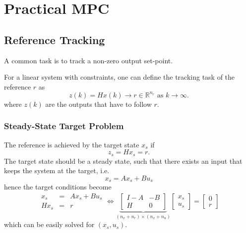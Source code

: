 \section{Practical MPC}

\subsection{Reference Tracking}

A common task is to track a non-zero output set-point.

For a linear system with constraints, one can define the tracking task of the reference $r$ as
\begin{equation*}
    z(k) = Hx(k) \to r\in \mathbb{R}^{n_r} \text{ as } k \to \infty.
\end{equation*}
where $z(k)$ are the outputs that have to follow $r$.

\subsubsection{Steady-State Target Problem}

The reference is achieved by the target state $x_s$ if
\begin{equation*}
    z_s = Hx_s = r.
\end{equation*}
The target state should be a steady state, such that there exists an input that keeps the system at the target, i.e.
\begin{equation*}
    x_s = Ax_s +Bu_s
\end{equation*}
hence the target conditions become
\begin{equation*}
    \begin{array}{rcl}
        x_s  & = & Ax_s +Bu_s \\
        Hx_s & = & r
    \end{array}
    \Leftrightarrow
    \underbrace{\begin{bmatrix}
            I-A & -B \\
            H   & 0
        \end{bmatrix}}_{(n_x + n_r)\times(n_x + n_u)}
    \begin{bmatrix}
        x_s \\
        u_s
    \end{bmatrix}
    = \begin{bmatrix}
        0 \\
        r
    \end{bmatrix}
\end{equation*}
which can be easily solved for $(x_s, u_s)$.


